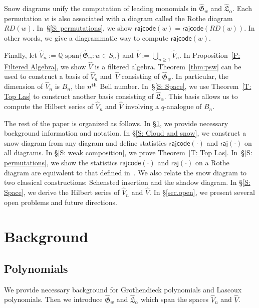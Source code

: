 \documentclass[ALCO]{cedram}
\newcommand{\fG}{\mathfrak{G}}
\newcommand{\fL}{\mathfrak{L}}
\newcommand{\topLas}{\widehat{\fL}}
\newcommand{\topGro}{\widehat{\fG}}
\newcommand{\Q}{\mathbb{Q}}
\newcommand{\rajcode}{\mathsf{rajcode}}
\newcommand{\raj}{\mathsf{raj}}
\begin{document}
Snow diagrams unify the computation of leading monomials in $\topGro_w$ and $\topLas_\alpha$.
Each permutation $w$ is also associated
with a diagram called the Rothe diagram
$RD(w)$.
In~\S\ref{S: permutations},
we show $\rajcode(w) = \rajcode(RD(w))$.
In other words, we give a diagrammatic way to compute $\rajcode(w)$.

Finally, let $\widehat{V}_n :=  \Q\textrm{-span}\{\topGro_w: w \in S_n\}$ and $\widehat{V} :=  
\bigcup_{n \geq 1} \widehat{V}_n$.
In Proposition~\ref{P: Filtered Algebra},
we show $\widehat{V}$
is a filtered algebra. 
Theorem~\ref{thm:psw} can be used to construct a basis of $\widehat{V}_n$
and~$\widehat{V}$ 
consisting of $\topGro_w$.
In particular, 
the dimension of $\widehat{V}_n$
is $B_n$, the $n\textsuperscript{th}$ Bell number.
In~\S\ref{S: Space},
we use Theorem~\ref{T: Top Las} to construct another basis consisting of $\topLas_\alpha$.
This basis allows us to compute the Hilbert series of $\widehat{V}_n$ 
and $\widehat{V}$
involving a $q$-analogue of $B_n$.

The rest of the paper is organized as follows. 
In \S\ref{S: Background}, we provide necessary background information and notation.
In \S\ref{S: Cloud and snow}, we construct a snow diagram from any diagram 
and define statistics $\rajcode(\cdot)$ and $ \raj(\cdot)$ on all diagrams.
In \S\ref{S: weak composition}, we  prove Theorem~\ref{T: Top Las}.
In~\S\ref{S: permutations}, we show the statistics $\rajcode(\cdot)$ and $\raj(\cdot)$ 
on a Rothe diagram are equivalent to that defined in~\cite{PSW}.
We also relate the snow diagram to two classical constructions: 
Schensted insertion and the shadow diagram.
In \S\ref{S: Space}, we derive the Hilbert series 
of $\widehat{V}_n$ and $\widehat{V}$.
In \S\ref{sec.open}, we present several open problems and future directions.

\section{Background}
\label{S: Background}
\subsection{Polynomials}
We provide necessary background
for Grothendieck polynomials and Lascoux polynomials.
Then we introduce
$\topGro_w$ and $\topLas_\alpha$ 
which span the spaces $\widehat{V}_n$ and $\widehat{V}$. 
\end{document}
